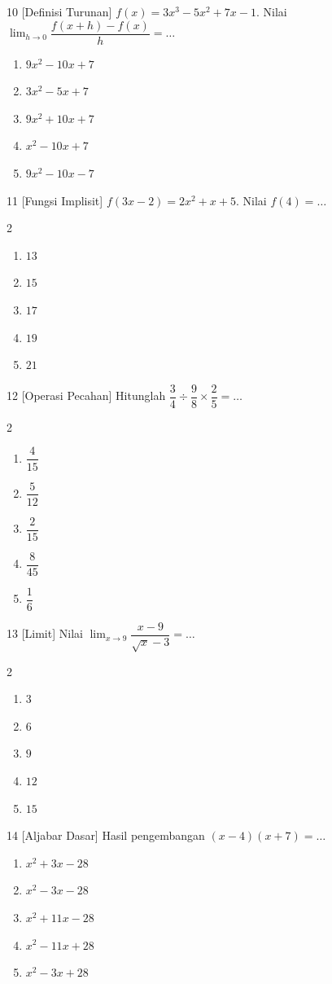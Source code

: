 \documentclass[11pt]{article}
\newenvironment{pil}{%
  \begin{enumerate}[label=(\alph*),leftmargin=*,itemsep=1pt,topsep=3pt]}%
  {\end{enumerate}}
\newenvironment{pilB}{%
  \par\smallskip\begin{multicols}{2}
  \begin{enumerate}[label=(\alph*),leftmargin=*,itemsep=1pt,topsep=3pt]}%
  {\end{enumerate}\end{multicols}}
\begin{document}
\begin{soal}{10 \normalfont\small[Definisi Turunan]}
$f(x)=3x^3-5x^2+7x-1$. Nilai $\displaystyle\lim_{h\to0}\dfrac{f(x+h)-f(x)}{h}=\ldots$
\begin{pil}
  \item $9x^2-10x+7$ \item $3x^2-5x+7$
  \item $9x^2+10x+7$ \item $x^2-10x+7$ \item $9x^2-10x-7$
\end{pil}
\end{soal}

\begin{soal}{11 \normalfont\small[Fungsi Implisit]}
$f(3x-2)=2x^2+x+5$. Nilai $f(4)=\ldots$
\begin{pilB}
  \item $13$ \item $15$ \item $17$ \item $19$ \item $21$
\end{pilB}
\end{soal}

\begin{soal}{12 \normalfont\small[Operasi Pecahan]}
Hitunglah $\dfrac34\div\dfrac98\times\dfrac25=\ldots$
\begin{pilB}
  \item $\dfrac{4}{15}$ \item $\dfrac{5}{12}$ \item $\dfrac{2}{15}$ \item $\dfrac{8}{45}$ \item $\dfrac{1}{6}$
\end{pilB}
\end{soal}

\begin{soal}{13 \normalfont\small[Limit]}
Nilai $\displaystyle\lim_{x\to9}\dfrac{x-9}{\sqrt{x}-3}=\ldots$
\begin{pilB}
  \item $3$ \item $6$ \item $9$ \item $12$ \item $15$
\end{pilB}
\end{soal}

\begin{soal}{14 \normalfont\small[Aljabar Dasar]}
Hasil pengembangan $(x-4)(x+7)=\ldots$
\begin{pil}
  \item $x^2+3x-28$ \item $x^2-3x-28$
  \item $x^2+11x-28$ \item $x^2-11x+28$ \item $x^2-3x+28$
\end{pil}
\end{soal}
\end{document}
